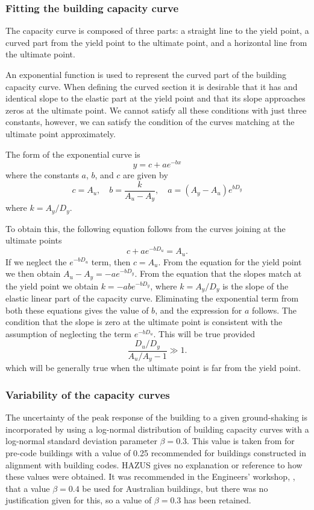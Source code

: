 \subsubsection{Fitting the building capacity curve}

The capacity curve is composed of three
parts: a straight line to the yield point, a curved part from the
yield point to the ultimate point, and a horizontal line from the
ultimate point.


An exponential function is used to represent the curved part of
the building capacity curve.  When defining
the curved section it is desirable that it has and identical slope
to the elastic part at the yield point and that its slope
approaches zeros at the ultimate point. We cannot satisfy all
these conditions with just three constants, however, we can
satisfy the condition of the curves matching at the ultimate point
approximately.

The form of the exponential curve is
$$
 y = c + a e^{-bx}
$$
where the constants $a$, $b$, and $c$ are given by
\begin{equation}
c = A_u,\quad b = \frac{k}{A_u-A_y}, \quad
a = (A_y-A_u)e^{b D_y}
\end{equation}
where $k = A_y/D_y$.

To obtain this, the following equation follows from the curves
joining at the ultimate points
$$
 c+ae^{-bD_u} = A_u.
$$
If we neglect the $e^{-bD_u}$ term, then $c=A_u$. From the
equation for the yield point we then obtain $A_u-A_y =
-ae^{-bD_y}$. From the equation that the slopes match at the yield
point we obtain $k = -abe^{-bD_y}$, where $k=A_y/D_y$ is the slope
of the elastic linear part of the capacity curve. Eliminating the exponential term from both these equations
gives the value of $b$, and the expression for $a$ follows. The
condition that the slope is zero at the ultimate point is
consistent with the assumption of neglecting the term $e^{-bD_u}$.
This will be true provided
$$
 \frac{D_u/D_y}{A_u/A_y-1} \gg 1.
$$
which will be generally true when the ultimate point is far from the
yield point.


\subsubsection{Variability of the capacity curves}
\label{sec:dam-capacity-var}

The uncertainty of the peak response of the building to a given
ground-shaking is incorporated by using a log-normal distribution
of building capacity curves with a
log-normal standard deviation parameter $\beta=0.3$. This value is
taken from \cite{dr_FEMA99b} for pre-code buildings with a value
of 0.25 recommended for buildings constructed in alignment with
building codes. HAZUS gives no explanation or reference to how
these values were obtained. It was recommended in the Engineers'
workshop, \cite{dr_Stehle01a}, that a value $\beta=0.4$ be used
for Australian buildings, but there was no justification given for
this, so a value of $\beta=0.3$ has been retained.

